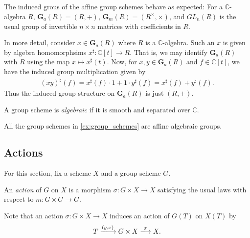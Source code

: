 \documentclass[12pt]{ociamthesis}  %
\begin{document}
\begin{example}
  The induced grous of the affine group schemes behave as expected:
  For a $\mathbb{C}$-algebra $R$, $\mathbf{G}_a(R) = (R,+)$,
  $\mathbf{G}_m(R) = (R^\times,\times)$, and
  $GL_n(R)$ is the usual group of invertible $n\times n$ matrices
  with coefficients in $R$.

  In more detail, consider $x\in\mathbf{G}_a(R)$ where $R$ is
  a $\mathbb{C}$-algebra. Such an $x$ is given by algebra homomorphsims
  $x^\sharp:\mathbb{C}[t] \to R$. That is, we may identify
  $\mathbf{G}_a(R)$ with $R$ using the map $x \mapsto x^\sharp(t)$. Now,
  for $x,y\in\mathbf{G}_a(R)$ and $f\in \mathbb{C}[t]$, we have the
  induced group multiplication given by
  \begin{align*}
    (xy)^\sharp(f)
    = x^\sharp(f) \cdot 1 + 1 \cdot y^\sharp(f)
    = x^\sharp(f) + y^\sharp(f).
  \end{align*}
  Thus the induced group structure on $\mathbf{G}_a(R)$ is just $(R,+)$.
\end{example}

\begin{definition}
  A group scheme is \emph{algebraic} if it is smooth and separated
  over $\mathbb{C}$.
\end{definition}

\begin{example}
  All the group schemes in \ref{ex:group_schemes} are affine algebraic
  groups.
\end{example}

\subsection{Actions}

For this section, fix a scheme $X$ and a group scheme $G$.

\begin{definition}
  An \emph{action} of $G$ on $X$ is a morphism
  $\sigma : G\times X\to X$ satisfying the usual laws with respect
  to $m:G\times G\to G$.
\end{definition}

Note that an action $\sigma : G\times X\to X$ induces an action of
$G(T)$ on $X(T)$ by
\begin{equation*}
  T \xlongrightarrow{(g,x)} G\times X \xlongrightarrow{\sigma} X.
\end{equation*}

\begin{example}
  \missingexample
\end{example}
\end{document}
